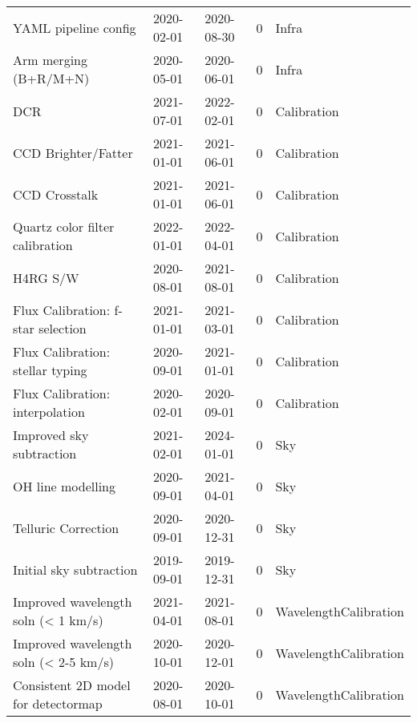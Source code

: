 \begin{tabular}{lllrl}
                        YAML pipeline config &  2020-02-01 &  2020-08-30 &         0 &                  Infra \\
                       Arm merging (B+R/M+N) &  2020-05-01 &  2020-06-01 &         0 &                  Infra \\
                                         DCR &  2021-07-01 &  2022-02-01 &         0 &            Calibration \\
                         CCD Brighter/Fatter &  2021-01-01 &  2021-06-01 &         0 &            Calibration \\
                               CCD Crosstalk &  2021-01-01 &  2021-06-01 &         0 &            Calibration \\
             Quartz color filter calibration &  2022-01-01 &  2022-04-01 &         0 &            Calibration \\
                                    H4RG S/W &  2020-08-01 &  2021-08-01 &         0 &            Calibration \\
          Flux Calibration: f-star selection &  2021-01-01 &  2021-03-01 &         0 &            Calibration \\
            Flux Calibration: stellar typing &  2020-09-01 &  2021-01-01 &         0 &            Calibration \\
             Flux Calibration: interpolation &  2020-02-01 &  2020-09-01 &         0 &            Calibration \\
                    Improved sky subtraction &  2021-02-01 &  2024-01-01 &         0 &                    Sky \\
                           OH line modelling &  2020-09-01 &  2021-04-01 &         0 &                    Sky \\
                         Telluric Correction &  2020-09-01 &  2020-12-31 &         0 &                    Sky \\
                     Initial sky subtraction &  2019-09-01 &  2019-12-31 &         0 &                    Sky \\
         Improved wavelength soln (< 1 km/s) &  2021-04-01 &  2021-08-01 &         0 &  WavelengthCalibration \\
       Improved wavelength soln (< 2-5 km/s) &  2020-10-01 &  2020-12-01 &         0 &  WavelengthCalibration \\
         Consistent 2D model for detectormap &  2020-08-01 &  2020-10-01 &         0 &  WavelengthCalibration \\

\end{tabular}
